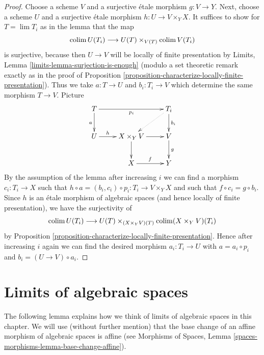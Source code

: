 \begin{proof}
Choose a scheme $V$ and a surjective \'etale morphism $g : V \to Y$.
Next, choose a scheme $U$ and a surjective \'etale morphism
$h : U \to V \times_Y X$. It suffices to show for $T = \lim T_i$
as in the lemma that the map
$$
\mathop{\mathrm{colim}}\nolimits U(T_i) \longrightarrow U(T) \times_{V(T)} \mathop{\mathrm{colim}}\nolimits V(T_i)
$$
is surjective, because then $U \to V$ will be locally of finite
presentation by Limits, Lemma \ref{limits-lemma-surjection-is-enough}
(modulo a set theoretic remark exactly as in the proof of
Proposition \ref{proposition-characterize-locally-finite-presentation}).
Thus we take $a : T \to U$ and $b_i : T_i \to V$ which determine
the same morphism $T \to V$. Picture
$$
\xymatrix{
T \ar[d]_a \ar[rr]_{p_i} & & T_i \ar[d]^{b_i} \ar@{..>}[ld] \\
U \ar[r]^-h & X \times_Y V \ar[d] \ar[r] & V \ar[d]^g \\
& X \ar[r]^f & Y
}
$$
By the assumption of the lemma after increasing $i$
we can find a morphism $c_i : T_i \to X$ such that
$h \circ a = (b_i, c_i) \circ p_i : T_i \to V \times_Y X$
and such that $f \circ c_i = g \circ b_i$.
Since $h$ is an \'etale morphism of algebraic spaces
(and hence locally of finite presentation), we have the surjectivity of
$$
\mathop{\mathrm{colim}}\nolimits U(T_i) \longrightarrow U(T) \times_{(X \times_Y V)(T)}
\mathop{\mathrm{colim}}\nolimits (X \times_Y V)(T_i)
$$
by Proposition \ref{proposition-characterize-locally-finite-presentation}.
Hence after increasing $i$ again we can find the desired
morphism $a_i : T_i \to U$ with $a = a_i \circ p_i$ and
$b_i = (U \to V) \circ a_i$.
\end{proof}















\section{Limits of algebraic spaces}
\label{section-limits}

\noindent
The following lemma explains how we think of limits of algebraic
spaces in this chapter. We will use (without further mention) that the
base change of an affine morphism of algebraic spaces is affine (see
Morphisms of Spaces, Lemma \ref{spaces-morphisms-lemma-base-change-affine}).

